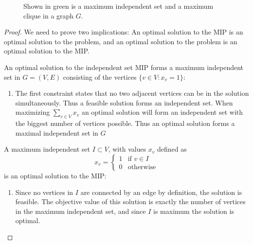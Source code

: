 \begin{example}
\begin{figure}[H]
\caption{Shown in green is a maximum independent set and a maximum clique in a graph $G$.}
\end{figure}
\begin{proof}
We need to prove two implications: An optimal solution to the MIP is an optimal solution to the problem, and an optimal solution to the problem is an optimal solution to the MIP. 

\noindent An optimal solution to the independent set MIP forms a maximum independent set in $G=(V,E)$ consisting of the vertices $\{v\in V:x_v=1\}$:
\begin{enumerate}
\item The first constraint states that no two adjacent vertices can be in the solution simultaneously. Thus a feasible solution forms an independent set.
When maximizing $\sum_{v\in V} x_v$ an optimal solution will form an independent set with the biggest number of vertices possible. Thus an optimal solution forms a maximal independent set in $G$
\end{enumerate}
A maximum independent set $I\subset V$, with values $x_v$ defined as $$x_{v} = \left\{
\begin{array}{ll}
1 & \text{if } v \in I \\ 0 & \text{otherwise}
\end{array}\right.$$ is an optimal solution to the MIP:
\begin{enumerate}
\item Since no vertices in $I$ are connected by an edge by definition, the solution is feasible. The objective value of this solution is exactly the number of vertices in the maximum independent set, and since $I$ is maximum the solution is optimal.
\end{enumerate}


\end{proof}
\end{example}
